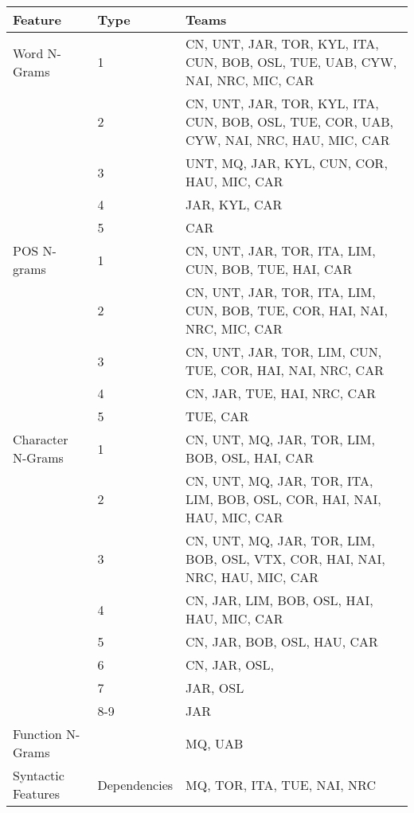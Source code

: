 \documentclass[11pt,letterpaper]{article}
\begin{document}
\begin{table*}[!ht]
\begin{center}
\begin{small}
\begin{tabular}{|l|l|p{9.5cm}|}
\hline
{\bf Feature} & {\bf Type} & {\bf Teams} \\  \hline
Word N-Grams       & 1      & CN, UNT, JAR, TOR, KYL, ITA, CUN, BOB, OSL, TUE, UAB, CYW, NAI, NRC, MIC, CAR   \\ \hline
		   & 2      & CN, UNT, JAR, TOR, KYL, ITA, CUN, BOB, OSL, TUE, COR, UAB, CYW, NAI, NRC, HAU, MIC, CAR \\ \hline
                   & 3      & UNT, MQ, JAR, KYL, CUN, COR, HAU, MIC, CAR  \\ \hline
                   & 4      & JAR, KYL, CAR   \\ \hline
		   & 5      & CAR \\ \hline
POS N-grams        & 1      & CN, UNT, JAR, TOR, ITA, LIM, CUN, BOB, TUE, HAI, CAR  \\ \hline
		   & 2      & CN, UNT, JAR, TOR, ITA, LIM, CUN, BOB, TUE, COR, HAI, NAI, NRC, MIC, CAR   \\ \hline
                   & 3      & CN, UNT, JAR, TOR, LIM, CUN, TUE, COR, HAI, NAI, NRC, CAR     \\ \hline
                   & 4      & CN, JAR, TUE, HAI, NRC, CAR    \\ \hline
                   & 5      & TUE, CAR \\ \hline
Character N-Grams  & 1      & CN, UNT, MQ, JAR, TOR, LIM, BOB, OSL, HAI, CAR  \\ \hline
                   & 2      & CN, UNT, MQ, JAR, TOR, ITA, LIM, BOB, OSL, COR, HAI, NAI, HAU, MIC, CAR  \\ \hline
                   & 3      & CN, UNT, MQ, JAR, TOR, LIM, BOB, OSL, VTX, COR, HAI, NAI, NRC, HAU, MIC, CAR \\ \hline
                   & 4      & CN, JAR, LIM, BOB, OSL, HAI, HAU, MIC, CAR \\ \hline
                   & 5      & CN, JAR, BOB, OSL, HAU, CAR  \\ \hline
                   & 6      & CN, JAR, OSL,   \\ \hline
	           & 7      & JAR, OSL \\ \hline
                   & 8-9    & JAR \\ \hline
Function N-Grams   &        & MQ, UAB  \\ \hline
Syntactic Features & Dependencies        & MQ, TOR, ITA, TUE, NAI, NRC \\ \hline

\end{tabular}
\end{small}
\end{center}
\end{table*}
\end{document}
